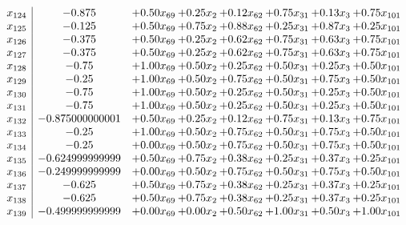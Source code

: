 \documentclass[8pt]{article}
\begin{document}
\[\begin{array}{c| c c@{\hskip 2pt} c@{\hskip 2pt} c@{\hskip 2pt} c@{\hskip 2pt} c@{\hskip 2pt} c@{\hskip 2pt} }
 x_{124}   &  -0.875 & +  0.50 x_{69} & +  0.25 x_{2} & +  0.12 x_{62} & +  0.75 x_{31} & +  0.13 x_{3} & +  0.75 x_{101}\\
 x_{125}   &  -0.125 & +  0.50 x_{69} & +  0.75 x_{2} & +  0.88 x_{62} & +  0.25 x_{31} & +  0.87 x_{3} & +  0.25 x_{101}\\
 x_{126}   &  -0.375 & +  0.50 x_{69} & +  0.25 x_{2} & +  0.62 x_{62} & +  0.75 x_{31} & +  0.63 x_{3} & +  0.75 x_{101}\\
 x_{127}   &  -0.375 & +  0.50 x_{69} & +  0.25 x_{2} & +  0.62 x_{62} & +  0.75 x_{31} & +  0.63 x_{3} & +  0.75 x_{101}\\
 x_{128}   &  -0.75 & +  1.00 x_{69} & +  0.50 x_{2} & +  0.25 x_{62} & +  0.50 x_{31} & +  0.25 x_{3} & +  0.50 x_{101}\\
 x_{129}   &  -0.25 & +  1.00 x_{69} & +  0.50 x_{2} & +  0.75 x_{62} & +  0.50 x_{31} & +  0.75 x_{3} & +  0.50 x_{101}\\
 x_{130}   &  -0.75 & +  1.00 x_{69} & +  0.50 x_{2} & +  0.25 x_{62} & +  0.50 x_{31} & +  0.25 x_{3} & +  0.50 x_{101}\\
 x_{131}   &  -0.75 & +  1.00 x_{69} & +  0.50 x_{2} & +  0.25 x_{62} & +  0.50 x_{31} & +  0.25 x_{3} & +  0.50 x_{101}\\
 x_{132}   &  -0.875000000001 & +  0.50 x_{69} & +  0.25 x_{2} & +  0.12 x_{62} & +  0.75 x_{31} & +  0.13 x_{3} & +  0.75 x_{101}\\
 x_{133}   &  -0.25 & +  1.00 x_{69} & +  0.50 x_{2} & +  0.75 x_{62} & +  0.50 x_{31} & +  0.75 x_{3} & +  0.50 x_{101}\\
 x_{134}   &  -0.25 & +  0.00 x_{69} & +  0.50 x_{2} & +  0.75 x_{62} & +  0.50 x_{31} & +  0.75 x_{3} & +  0.50 x_{101}\\
 x_{135}   &  -0.624999999999 & +  0.50 x_{69} & +  0.75 x_{2} & +  0.38 x_{62} & +  0.25 x_{31} & +  0.37 x_{3} & +  0.25 x_{101}\\
 x_{136}   &  -0.249999999999 & +  0.00 x_{69} & +  0.50 x_{2} & +  0.75 x_{62} & +  0.50 x_{31} & +  0.75 x_{3} & +  0.50 x_{101}\\
 x_{137}   &  -0.625 & +  0.50 x_{69} & +  0.75 x_{2} & +  0.38 x_{62} & +  0.25 x_{31} & +  0.37 x_{3} & +  0.25 x_{101}\\
 x_{138}   &  -0.625 & +  0.50 x_{69} & +  0.75 x_{2} & +  0.38 x_{62} & +  0.25 x_{31} & +  0.37 x_{3} & +  0.25 x_{101}\\
 x_{139}   &  -0.499999999999 & +  0.00 x_{69} & +  0.00 x_{2} & +  0.50 x_{62} & +  1.00 x_{31} & +  0.50 x_{3} & +  1.00 x_{101}\\

\end{array}\]
\end{document}
